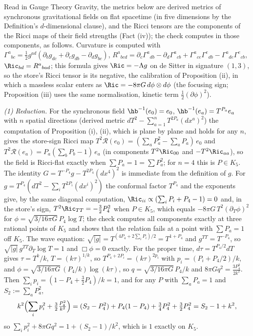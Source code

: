 Read in Gauge Theory Gravity, the metrics below are derived metrics of synchronous gravitational fields on flat spacetime (in five dimensions by the Definition's $d$-dimensional clause), and the Ricci tensors are the components of the Ricci maps of their field strengths (Fact (iv)); the check computes in those components, as follows. Curvature is computed with $\Gamma^{a}{}_{bc} = \frac12 g^{ad}(\partial_{b}g_{dc} + \partial_{c}g_{db} - \partial_{d}g_{bc})$, $R^{a}{}_{bcd} = \partial_{c}\Gamma^{a}{}_{db} - \partial_{d}\Gamma^{a}{}_{cb} + \Gamma^{a}{}_{ce}\Gamma^{e}{}_{db} - \Gamma^{a}{}_{de}\Gamma^{e}{}_{cb}$, $\Ric_{bd} = R^{a}{}_{bad}$; this formula gives $\Ric = -\Lambda g$ on de Sitter in signature $(1,3)$, so the store's Ricci tensor is its negative, the calibration of Proposition (ii), in which a massless scalar enters as $\Ric = -8\pi G\,d\phi\otimes d\phi$ (the focusing sign; Proposition (iii) uses the same normalisation, kinetic term $\frac12(\partial\phi)^{2}$).

\emph{(1) Reduction.} For the synchronous field $\hb^{-1}(e_{0}) = e_{0}$, $\hb^{-1}(e_{a}) = T^{P_{a}}e_{a}$ with $n$ spatial directions (derived metric $dT^{2} - \sum_{a=1}^{n}T^{2P_{a}}(dx^{a})^{2}$) the computation of Proposition (i), (ii), which is plane by plane and holds for any $n$, gives the store-sign Ricci map $T^{2}\mathcal{R}(e_{0}) = (\sum_a P_a^{2} - \sum_a P_a)\,e_{0}$ and $T^{2}\mathcal{R}(e_{a}) = P_{a}(\sum_b P_b - 1)\,e_{a}$ (in components $T^{2}\Ric_{00}$ and $-T^{2}\Ric_{aa}$), so the field is Ricci-flat exactly when $\sum P_a = 1 = \sum P_a^{2}$; for $n = 4$ this is $P \in K_{5}$. The identity $G = T^{-P_4}g - T^{2P_4}(dx^4)^2$ is immediate from the definition of $g$. For $g = T^{P_4}(dT^{2} - \sum_{i}T^{2P_i}(dx^{i})^{2})$ the conformal factor $T^{P_4}$ and the exponents give, by the same diagonal computation, $\Ric_{ii} \propto (\sum_i P_i + P_4 - 1) = 0$ and, in the store's sign, $T^{2}\Ric_{TT} = -\frac32 P_4^{2}$ when $P \in K_{5}$, which equals $-8\pi G\,T^{2}(\partial_{T}\phi)^{2}$ for $\phi = \sqrt{3/16\pi G}\,P_4\log T$; the check computes all components exactly at three rational points of $K_{5}$ and shows that the relation fails at a point with $\sum P_a = 1$ off $K_{5}$. The wave equation: $\sqrt{|g|} = T^{(4P_4 + 2\sum_i P_i)/2} = T^{1 + P_4}$ and $g^{TT} = T^{-P_4}$, so $\sqrt{|g|}\,g^{TT}\partial_T\log T = 1$ and $\Box\phi = 0$ exactly. For the proper time, $d\tau = T^{P_4/2}dT$ gives $\tau = T^{k}/k$, $T = (k\tau)^{1/k}$, so $T^{P_4 + 2P_i} = (k\tau)^{2p_i}$ with $p_i = (P_i + P_4/2)/k$, and $\phi = \sqrt{3/16\pi G}\,(P_4/k)\log(k\tau)$, so $q = \sqrt{3/16\pi G}\,P_4/k$ and $8\pi Gq^{2} = \frac{3P_4^{2}}{2k^{2}}$. Then $\sum_i p_i = (1 - P_4 + \frac32 P_4)/k = 1$, and for any $P$ with $\sum_a P_a = 1$ and $S_2 := \sum_a P_a^{2}$,
\[
k^{2}\Bigl(\sum_i p_i^{2} + \tfrac32\tfrac{P_4^{2}}{k^{2}}\Bigr) = (S_2 - P_4^{2}) + P_4(1 - P_4) + \tfrac34P_4^{2} + \tfrac32P_4^{2} = S_2 - 1 + k^{2},
\]
so $\sum_i p_i^{2} + 8\pi Gq^{2} = 1 + (S_2 - 1)/k^{2}$, which is $1$ exactly on $K_{5}$.

